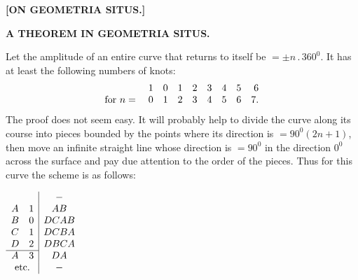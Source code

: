 \begin{center}
{\Large\bfseries{}}\par\medskip
[I.]

\bigskip \textbf{[ON GEOMETRIA SITUS.]}

\bigskip [1.]

\medskip \textbf{A THEOREM IN GEOMETRIA SITUS.}
\end{center}

Let the amplitude of an entire curve that returns to itself be
$=\pm n\,.\,360^0$. It has at least the following numbers of knots:
\[
\begin{array}{r@{\quad}rrrrrrrr}
&1&0&1&2&3&4&5&6\\
\text{for }n={}&0&1&2&3&4&5&6&7.
\end{array}
\]
The proof does not seem easy. It will probably help to divide the curve along its course into pieces bounded by the points where its direction is $=90^0(2n+1)$, then move an infinite straight line whose direction is $=90^0$ in the direction $0^0$ across the surface and pay due attention to the order of the pieces. Thus for this curve the scheme is as follows:

\begin{center}
\begin{minipage}{8cm}\centering

\end{minipage}\hfill
\begin{minipage}{3.8cm}\centering
$\begin{array}{cc|c}
&&-\\
A&1&AB\\
B&0&DCAB\\
C&1&DCBA\\
D&2&DBCA\\ \cline{1-2}
A&3&DA\\
\multicolumn{2}{c|}{\text{etc.}}&-
\end{array}$
\end{minipage}
\end{center}

